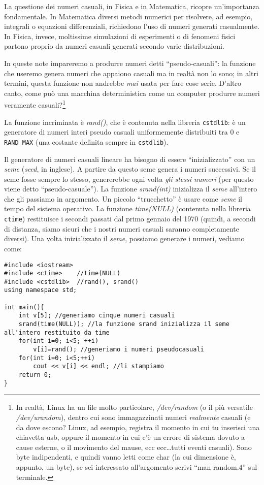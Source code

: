 La questione dei numeri casuali, in Fisica e in Matematica, ricopre un'importanza fondamentale. In Matematica diversi metodi numerici per risolvere, ad esempio, integrali o equazioni differenziali, richiedono l'uso di numeri generati casualmente. In Fisica, invece, moltissime simulazioni di esperimenti o di fenomeni fisici partono proprio da numeri casuali generati secondo varie distribuzioni.

In queste note impareremo a produrre numeri detti ``pseudo-casuali'': la funzione che useremo genera numeri che appaiono casuali ma in realtà non lo sono; in altri termini, questa funzione non andrebbe \emph{mai} usata per fare cose serie. D'altro canto, come può una macchina deterministica come un computer produrre numeri veramente casuali?\footnote{\label{truerand}In realtà, Linux ha un file molto particolare, \emph{/dev/random} (o il più versatile \emph{/dev/urandom}), dentro cui sono immagazzinati numeri \emph{realmente} casuali (e da dove escono? Linux, ad esempio, registra il momento in cui tu inserisci una chiavetta usb, oppure il momento in cui c'è un errore di sistema dovuto a cause esterne, o il movimento del mause, ecc ecc\ldots tutti eventi casuali). Sono byte indipendenti, e quindi vanno letti come char (la cui dimensione è, appunto, un byte), se sei interessato all'argomento scrivi ``man random.4'' sul terminale.}

La funzione incriminata è \emph{rand()}, che è contenuta nella libreria \verb|cstdlib|: è un generatore di numeri interi pseudo casuali uniformemente distribuiti tra 0 e \verb|RAND_MAX| (una costante definita sempre in \verb|cstdlib|).

Il generatore di numeri casuali lineare ha bisogno di essere ``inizializzato'' con un \emph{seme} (\emph{seed}, in inglese). A partire da questo seme genera i numeri successivi. Se il seme fosse sempre lo stesso, genererebbe ogni volta \emph{gli stessi numeri} (per questo viene detto ``pseudo-casuale''). La funzione \emph{srand(int)} inizializza il \emph{seme} all'intero che gli passiamo in argomento. Un piccolo ``trucchetto'' è usare come \emph{seme} il tempo del sistema operativo. La funzione \emph{time(NULL)} (contenuta nella libreria \verb|ctime|) restituisce i secondi passati dal primo gennaio del 1970 (quindi, a secondi di distanza, siamo sicuri che i nostri numeri casuali saranno completamente diversi). Una volta inizializzato il \emph{seme}, possiamo generare i numeri, vediamo come:

\begin{lstlisting}
#include <iostream>
#include <ctime>	//time(NULL)
#include <cstdlib>	//rand(), srand()
using namespace std;

int main(){
	int v[5]; //generiamo cinque numeri casuali
	srand(time(NULL)); //la funzione srand inizializza il seme all'intero restituito da time
	for(int i=0; i<5; ++i)
		v[i]=rand(); //generiamo i numeri pseudocasuali
	for(int i=0; i<5;++i)
		cout << v[i] << endl; //li stampiamo
	return 0;	
}
\end{lstlisting}  

